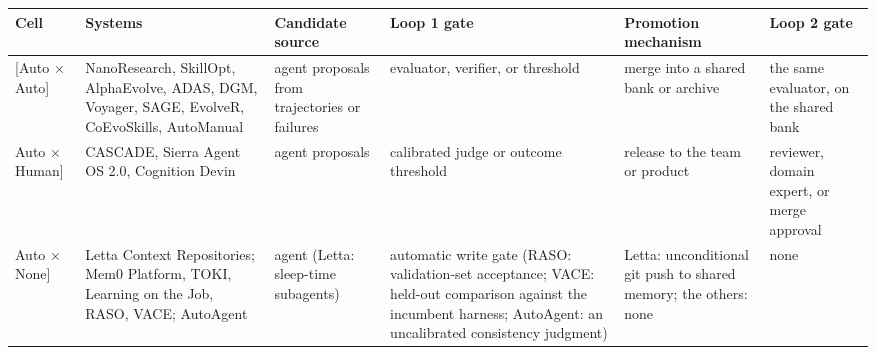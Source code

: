 \documentclass[
]{article}
\newcounter{none} %
\begin{document}
{\def\LTcaptype{none} %
\begin{longtable}[]{@{}
  >{\raggedright\arraybackslash}p{}
  >{\raggedright\arraybackslash}p{}
  >{\raggedright\arraybackslash}p{}
  >{\raggedright\arraybackslash}p{}
  >{\raggedright\arraybackslash}p{}
  >{\raggedright\arraybackslash}p{}@{}}
\toprule\noalign{}
\begin{minipage}[b]{\linewidth}\raggedright
Cell
\end{minipage} & \begin{minipage}[b]{\linewidth}\raggedright
Systems
\end{minipage} & \begin{minipage}[b]{\linewidth}\raggedright
Candidate source
\end{minipage} & \begin{minipage}[b]{\linewidth}\raggedright
Loop 1 gate
\end{minipage} & \begin{minipage}[b]{\linewidth}\raggedright
Promotion mechanism
\end{minipage} & \begin{minipage}[b]{\linewidth}\raggedright
Loop 2 gate
\end{minipage} \\
\midrule\noalign{}
\endhead
\bottomrule\noalign{}
\endlastfoot
{[}Auto × Auto{]} & NanoResearch, SkillOpt, AlphaEvolve, ADAS, DGM,
Voyager, SAGE, EvolveR, CoEvoSkills, AutoManual & agent proposals from
trajectories or failures & evaluator, verifier, or threshold & merge
into a shared bank or archive & the same evaluator, on the shared
bank \\
{[}Auto × Human{]} & CASCADE, Sierra Agent OS 2.0, Cognition Devin &
agent proposals & calibrated judge or outcome threshold & release to the
team or product & reviewer, domain expert, or merge approval \\
{[}Auto × None{]} & Letta Context Repositories; Mem0 Platform, TOKI,
Learning on the Job, RASO, VACE; AutoAgent & agent (Letta: sleep-time
subagents) & automatic write gate (RASO: validation-set acceptance;
VACE: held-out comparison against the incumbent harness; AutoAgent: an
uncalibrated consistency judgment) & Letta: unconditional git push to
shared memory; the others: none & none \\

\end{longtable}}
\end{document}
